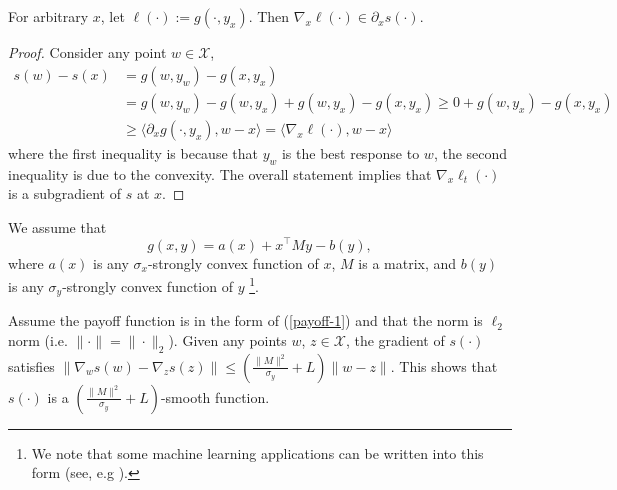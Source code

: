 \documentclass[final,12pt]{colt2018} %
\newcommand{\yx}[1]{y_{#1}}
\newcommand{\XX}{\mathcal{X}}
\begin{document}
\section{} \label{app:smoothH-1}


\begin{proposition} \label{sameGrad}
For arbitrary $x$, let $\ell(\cdot) := g(\cdot, \yx{x})$. Then $\nabla_{x} \ell(\cdot) \in \partial_{x} s(\cdot)$.
\end{proposition}
\begin{proof}
Consider any point $w \in \XX$,
\begin{equation}
\begin{aligned}
 s(w) - s(x) & = g(w,\yx{w}) - g(x, \yx{x}) 
\\ &= g(w,\yx{w}) - g(w, \yx{x})  + g(w,\yx{x}) - g(x, \yx{x})
\geq 0 + g(w,\yx{x}) - g(x, \yx{x})
\\ & \geq  \langle \partial_{x} g( \cdot, \yx{x}) , w - x \rangle = \langle \nabla_{x} \ell(\cdot) , w - x \rangle
\end{aligned}
\end{equation}
where the first inequality is because that $\yx{w}$ is the best response to $w$, the second inequality is due to the convexity.
The overall statement implies that $\nabla_{x} \ell_t(\cdot)$ is a subgradient of $s$ at $x$.
\end{proof}


We assume that
\begin{equation} \label{payoff-1}
g( x, y ) = a(x) +  x^\top M y - b(y),
\end{equation}
where $a(x)$ is any $\sigma_x$-strongly convex function of $x$, $M$ is a matrix, and $b(y)$ is any $\sigma_y$-strongly convex function of $y$ \footnote{We note that some machine learning applications can be written into this form (see, e.g \cite{XNLS05,ZX15}).}.

\begin{proposition} \label{smoothH-1}
Assume the payoff function is in the form of (\ref{payoff-1}) and that the norm is $\ell_2$ norm (i.e. $\|\cdot \| = \|\cdot \|_2$).
Given any points $w$, $z \in \XX$, the gradient of $s(\cdot)$ satisfies
$\| \nabla_w s(w) - \nabla_z s(z)\| \leq (\frac{\|M\|^2}{\sigma_y} + L) \| w - z\|$.
This shows that $s(\cdot)$ is a $(\frac{\|M\|^2}{\sigma_y} + L)$-smooth function.
\end{proposition}
\end{document}
